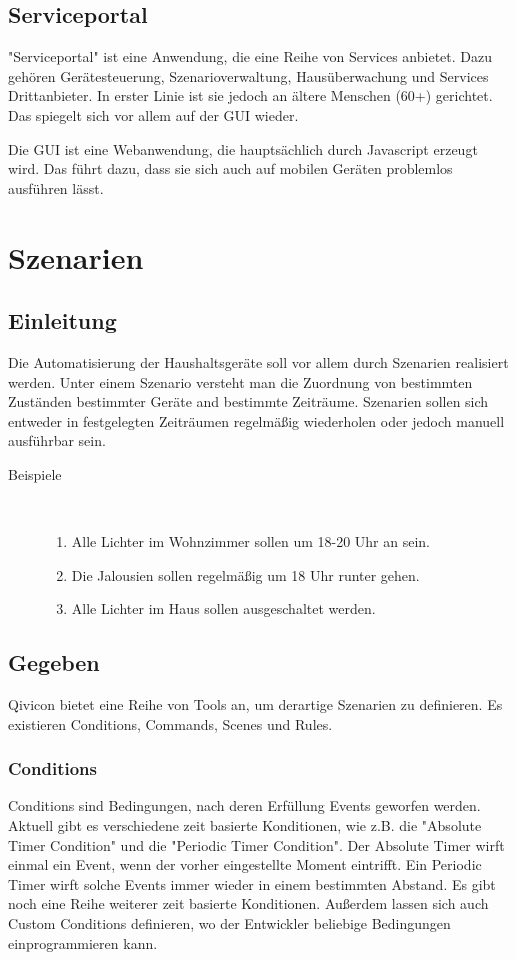 \subsection{Serviceportal}
"Serviceportal" ist eine Anwendung, die eine Reihe von Services anbietet. Dazu gehören Gerätesteuerung, Szenarioverwaltung, Hausüberwachung und Services Drittanbieter. In erster Linie ist sie jedoch an ältere Menschen (60+) gerichtet. Das spiegelt sich vor allem auf der GUI wieder.

Die GUI ist eine Webanwendung, die hauptsächlich durch Javascript erzeugt wird. Das führt dazu, dass sie sich auch auf mobilen Geräten problemlos ausführen lässt.

\section{Szenarien}
\subsection{Einleitung}
Die Automatisierung der Haushaltsgeräte soll vor allem durch Szenarien realisiert werden. Unter einem Szenario versteht man die Zuordnung von bestimmten Zuständen bestimmter Geräte and bestimmte Zeiträume. Szenarien sollen sich entweder in festgelegten Zeiträumen regelmäßig wiederholen oder jedoch manuell ausführbar sein.
\begin{description}
	\item[Beispiele]~\par
	\begin{enumerate}
		\item Alle Lichter im Wohnzimmer sollen um 18-20 Uhr an sein.
		\item Die Jalousien sollen regelmäßig um 18 Uhr runter gehen.
		\item Alle Lichter im Haus sollen ausgeschaltet werden.
	\end{enumerate}
\end{description}

\subsection{Gegeben}
Qivicon bietet eine Reihe von Tools an, um derartige Szenarien zu definieren. Es existieren  Conditions, Commands, Scenes und Rules.

\subsubsection{Conditions}
Conditions sind Bedingungen, nach deren Erfüllung Events geworfen werden. Aktuell gibt es verschiedene zeit basierte Konditionen, wie z.B. die "Absolute Timer Condition" und die "Periodic Timer Condition". Der Absolute Timer wirft einmal ein Event, wenn der vorher eingestellte Moment eintrifft. Ein Periodic Timer wirft solche Events immer wieder in einem bestimmten Abstand.
Es gibt noch eine Reihe weiterer zeit basierte Konditionen. Außerdem lassen sich auch Custom Conditions definieren, wo der Entwickler beliebige Bedingungen einprogrammieren kann.


